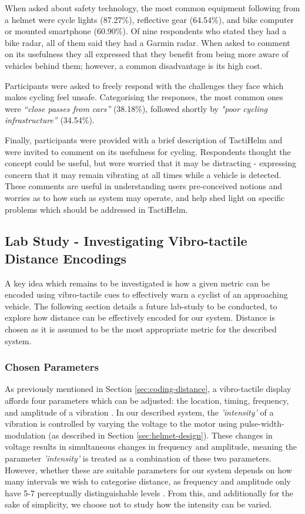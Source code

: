 \documentclass{interim}
\begin{document}
When asked about safety technology, the most common equipment following from a helmet were cycle lights (87.27\%), reflective gear (64.54\%), and bike computer or mounted smartphone (60.90\%). Of nine respondents who stated they had a bike radar, all of them said they had a Garmin radar. When asked to comment on its usefulness they all expressed that they benefit from being more aware of vehicles behind them; however, a common disadvantage is its high cost.

Participants were asked to freely respond with the challenges they face which makes cycling feel unsafe. Categorising the responses, the most common ones were \textit{“close passes from cars”} (38.18\%), followed shortly by \textit{"poor cycling infrastructure”} (34.54\%).

Finally, participants were provided with a brief description of TactiHelm and were invited to comment on its usefulness for cycling. Respondents thought the concept could be useful, but were worried that it may be distracting - expressing concern that it may remain vibrating at all times while a vehicle is detected. These comments are useful in understanding users pre-conceived notions and worries as to how such as system may operate, and help shed light on specific problems which should be addressed in TactiHelm.


\subsection{Lab Study - Investigating Vibro-tactile Distance Encodings}\label{sec:lab-study}
A key idea which remains to be investigated is how a given metric can be encoded using vibro-tactile cues to effectively warn a cyclist of an approaching vehicle. The following section details a future lab-study to be conducted, to explore how distance can be effectively encoded for our system. Distance is chosen as it is assumed to be the most appropriate metric for the described system.

\subsubsection{Chosen Parameters}
As previously mentioned in Section \ref{sec:coding-distance}, a vibro-tactile display affords four parameters which can be adjusted: the location, timing, frequency, and amplitude of a vibration \cite{guidelines}. In our described system, the \textit{'intensity'} of a vibration is controlled by varying the voltage to the motor using pulse-width-modulation (as described in Section \ref{sec:helmet-design}). These changes in voltage results in simultaneous changes in frequency and amplitude, meaning the parameter \textit{'intensity'} is treated as a combination of these two parameters. However, whether these are suitable parameters for our system depends on how many intervals we wish to categorise distance, as frequency and amplitude only have 5-7 perceptually distinguishable levels \cite{guidelines}. From this, and additionally for the sake of simplicity, we choose not to study how the intensity can be varied. 
\end{document}
